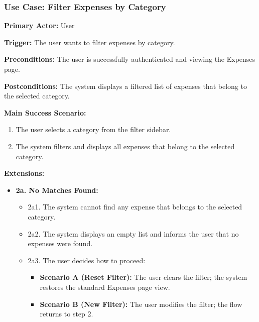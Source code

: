 \subsubsection{\textbf{Use Case: Filter Expenses by Category}}

\textbf{Primary Actor:} User

\textbf{Trigger:} The user wants to filter expenses by category.

\textbf{Preconditions:} The user is successfully authenticated and viewing the Expenses page.

\textbf{Postconditions:} The system displays a filtered list of expenses that belong to the selected category.

\vspace{0.5cm}

\textbf{Main Success Scenario:}

\begin{enumerate} [leftmargin=0.75cm, noitemsep]
\item The user selects a category from the filter sidebar.
\item The system filters and displays all expenses that belong to the selected category.
\end{enumerate}

\vspace{0.3cm}

\textbf{Extensions:}

\begin{itemize} [label={}, leftmargin=0.75cm, noitemsep]

\item \textbf{2a. No Matches Found:}
\begin{itemize} [label={}, leftmargin=0.75cm, noitemsep]
    \item 2a1. The system cannot find any expense that belongs to the selected category.
    \item 2a2. The system displays an empty list and informs the user that no expenses were found.
    \item 2a3. The user decides how to proceed:
    \begin{itemize} [label={}, leftmargin=0.75cm, noitemsep]
        \item \textbf{Scenario A (Reset Filter):} The user clears the filter; the system restores the standard Expenses page view.
        \item \textbf{Scenario B (New Filter):} The user modifies the filter; the flow returns to step 2.
    \end{itemize}
\end{itemize}

\end{itemize}

\vspace{0.3cm}
